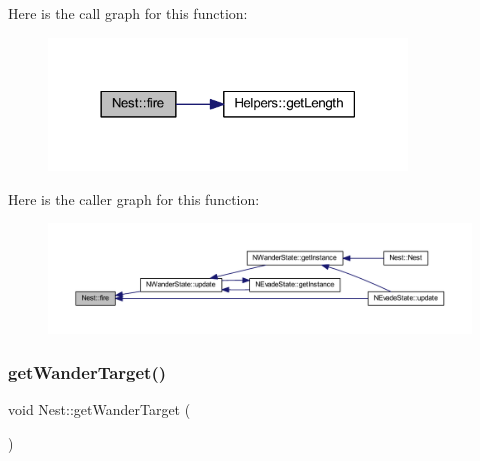 Here is the call graph for this function\+:
\nopagebreak
\begin{figure}[H]
\begin{center}
\leavevmode
\includegraphics[width=270pt]{class_nest_ac8d249dfb5462f7942a1f898099ca0af_cgraph}
\end{center}
\end{figure}
Here is the caller graph for this function\+:
\nopagebreak
\begin{figure}[H]
\begin{center}
\leavevmode
\includegraphics[width=350pt]{class_nest_ac8d249dfb5462f7942a1f898099ca0af_icgraph}
\end{center}
\end{figure}
\mbox{\label{class_nest_a7cf537ca64aef6173067915a15e0cdec}} 
\subsubsection{\texorpdfstring{get\+Wander\+Target()}{getWanderTarget()}}
{\footnotesize\ttfamily void Nest\+::get\+Wander\+Target (\begin{DoxyParamCaption}{ }\end{DoxyParamCaption})}


